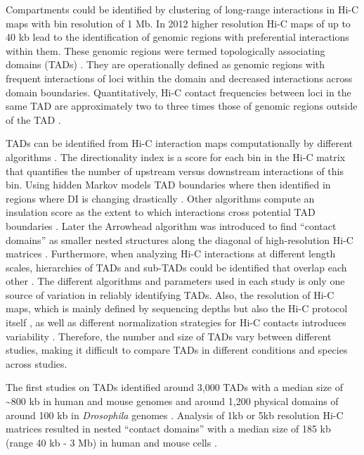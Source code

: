 \documentclass[a4paper,twoside=true,openright,parskip=full,chapterprefix=true,11pt,headings=normal,bibliography=totoc,listof=totoc,titlepage=on,captions=tableabove,draft=false]{scrreprt}
\theoremstyle{definition}
\theoremstyle{definition}
\theoremstyle{definition}
\theoremstyle{remark}
\begin{document}
Compartments could be identified by clustering of long-range
interactions in Hi-C maps with bin resolution of 1 Mb. In 2012 higher
resolution Hi-C maps of up to 40 kb lead to the identification of
genomic regions with preferential interactions within them. These
genomic regions were termed topologically associating domains (TADs)
\citep{Dixon2012, Nora2012, Sexton2012}. They are operationally defined
as genomic regions with frequent interactions of loci within the domain
and decreased interactions across domain boundaries. Quantitatively,
Hi-C contact frequencies between loci in the same TAD are approximately
two to three times those of genomic regions outside of the TAD
\citep{Merkenschlager2016}.

TADs can be identified from Hi-C interaction maps computationally by
different algorithms \citep{Ay2015}. The directionality index is a score
for each bin in the Hi-C matrix that quantifies the number of upstream
versus downstream interactions of this bin. Using hidden Markov models
TAD boundaries where then identified in regions where DI is changing
drastically \citep{Dixon2012}. Other algorithms compute an insulation
score as the extent to which interactions cross potential TAD boundaries
\citep{Crane2015}. Later the Arrowhead algorithm was introduced to find
``contact domains'' as smaller nested structures along the diagonal of
high-resolution Hi-C matrices \citep{Rao2014}. Furthermore, when
analyzing Hi-C interactions at different length scales, hierarchies of
TADs and sub-TADs could be identified that overlap each other
\citep{Filippova2014, Fraser2015}. The different algorithms and
parameters used in each study is only one source of variation in
reliably identifying TADs. Also, the resolution of Hi-C maps, which is
mainly defined by sequencing depths but also the Hi-C protocol itself
\citep{Rao2014}, as well as different normalization strategies for Hi-C
contacts introduces variability \citep{Dali2017, Forcato2017}.
Therefore, the number and size of TADs vary between different studies,
making it difficult to compare TADs in different conditions and species
across studies.

The first studies on TADs identified around 3,000 TADs with a median
size of \textasciitilde{}800 kb in human and mouse genomes
\citep{Dixon2012} and around 1,200 physical domains of around 100 kb in
\emph{Drosophila} genomes \citep{Sexton2012}. Analysis of 1kb or 5kb
resolution Hi-C matrices resulted in nested ``contact domains'' with a
median size of 185 kb (range 40 kb - 3 Mb) in human and mouse cells
\citep{Rao2014}.
\end{document}
